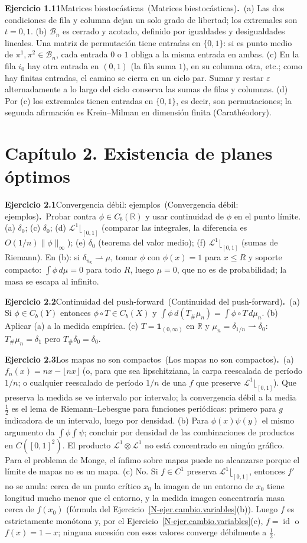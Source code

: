 \documentclass[11pt,a4paper]{amsart}
\newcommand{\id}{\operatorname{id}}
\newcommand{\ve}{\varepsilon}
\newcommand{\R}{{\mathbb R}}
\newcommand{\B}{{\mathcal B}}
\newcommand{\LL}{{\mathcal L}}
\newcommand{\I}{{\mathbf 1}}
\theoremstyle{remark}
\theoremstyle{definition}
\numberwithin{subsection}{section}
\numberwithin{equation}{section}
\newcommand{\ejlabel}[2]{\par\medskip\noindent\textbf{Ejercicio #1}\ifx\relax#2\relax\else\ (#2)\fi\textbf{.}\ }
\begin{document}
\ejlabel{1.11}{Matrices biestocásticas}(a) Las dos condiciones de fila y columna dejan un solo grado de libertad; los extremales son $t=0,1$. (b) $\B_n$ es cerrado y acotado, definido por igualdades y desigualdades lineales. Una matriz de permutación tiene entradas en $\{0,1\}$: si es punto medio de $\pi^1,\pi^2\in\B_n$, cada entrada $0$ o $1$ obliga a la misma entrada en ambas. (c) En la fila $i_0$ hay otra entrada en $(0,1)$ (la fila suma $1$), en su columna otra, etc.; como hay finitas entradas, el camino se cierra en un ciclo par. Sumar y restar $\ve$ alternadamente a lo largo del ciclo conserva las sumas de filas y columnas. (d) Por (c) los extremales tienen entradas en $\{0,1\}$, es decir, son permutaciones; la segunda afirmación es Krein--Milman en dimensión finita (Carathéodory).

\section*{Capítulo 2. Existencia de planes óptimos}
\ejlabel{2.1}{Convergencia débil: ejemplos}Probar contra $\phi\in C_b(\R)$ y usar continuidad de $\phi$ en el punto límite. (a) $\delta_0$; (c) $\delta_0$; (d) $\LL^1\lfloor_{[0,1]}$ (comparar las integrales, la diferencia es $O(1/n)\|\phi\|_\infty$); (e) $\delta_0$ (teorema del valor medio); (f) $\LL^1\lfloor_{[0,1]}$ (sumas de Riemann). En (b): si $\delta_{n_k}\rightharpoonup\mu$, tomar $\phi$ con $\phi(x)=1$ para $x\le R$ y soporte compacto: $\int\phi\,d\mu=0$ para todo $R$, luego $\mu=0$, que no es de probabilidad; la masa se escapa al infinito.

\ejlabel{2.2}{Continuidad del push-forward}(a) Si $\phi\in C_b(Y)$ entonces $\phi\circ T\in C_b(X)$ y $\int\phi\,d(T_\#\mu_n)=\int\phi\circ T\,d\mu_n$. (b) Aplicar (a) a la medida empírica. (c) $T=\I_{(0,\infty)}$ en $\R$ y $\mu_n=\delta_{1/n}\rightharpoonup\delta_0$: $T_\#\mu_n=\delta_1$ pero $T_\#\delta_0=\delta_0$.

\ejlabel{2.3}{Los mapas no son compactos}(a) $f_n(x)=nx-\lfloor nx\rfloor$ (o, para que sea lipschitziana, la carpa reescalada de período $1/n$; o cualquier reescalado de período $1/n$ de una $f$ que preserve $\LL^1\lfloor_{[0,1]}$). Que preserva la medida se ve intervalo por intervalo; la convergencia débil a la media $\frac12$ es el lema de Riemann--Lebesgue para funciones periódicas: primero para $g$ indicadora de un intervalo, luego por densidad. (b) Para $\phi(x)\psi(y)$ el mismo argumento da $\int\phi\int\psi$; concluir por densidad de las combinaciones de productos en $C([0,1]^2)$. El producto $\LL^1\otimes\LL^1$ no está concentrado en ningún gráfico. Para el problema de Monge, el ínfimo sobre mapas puede no alcanzarse porque el límite de mapas no es un mapa. (c) No. Si $f\in C^1$ preserva $\LL^1\lfloor_{[0,1]}$, entonces $f'$ no se anula: cerca de un punto crítico $x_0$ la imagen de un entorno de $x_0$ tiene longitud mucho menor que el entorno, y la medida imagen concentraría masa cerca de $f(x_0)$ (fórmula del Ejercicio~\ref{N-ejer.cambio.variables}(b)). Luego $f$ es estrictamente monótona y, por el Ejercicio~\ref{N-ejer.cambio.variables}(c), $f=\id$ o $f(x)=1-x$; ninguna sucesión con esos valores converge débilmente a $\frac12$.
\end{document}
